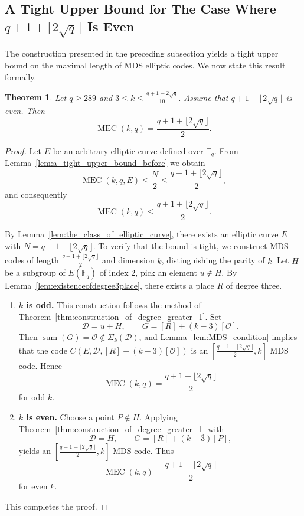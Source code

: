 \documentclass[journal,12pt,onecolumn]{IEEEtran}
\newtheorem{theorem}{Theorem}
\newcommand{\Point}{\operatorname{sum}}
\newcommand{\sumset}{\Sigma}
\begin{document}
\subsection{A Tight Upper Bound for The Case Where $q+1+ \lfloor 2\sqrt{q} \rfloor$ Is Even}


The construction presented in the preceding subsection yields a tight upper bound on the maximal length of MDS elliptic codes. We now state this result formally.

\begin{theorem}\label{thm:q+1+...even}
Let $q \ge 289$ and $3 \le k \le \frac{q+1-2\sqrt{q}}{10}$. Assume that $q+1+\lfloor 2\sqrt{q}\rfloor$ is even. Then
\[
\operatorname{MEC}(k,q) = \frac{q+1+\lfloor 2\sqrt{q}\rfloor}{2}.
\]
\end{theorem}

\begin{proof}
Let $E$ be an arbitrary elliptic curve defined over $\mathbb{F}_q$. From Lemma~\ref{lem:a_tight_upper_bound_before} we obtain
\[
\operatorname{MEC}(k,q,E) \le \frac{N}{2} \le \frac{q+1+\lfloor 2\sqrt{q}\rfloor}{2},
\]
and consequently
\[
\operatorname{MEC}(k,q) \le \frac{q+1+\lfloor 2\sqrt{q}\rfloor}{2}.
\]

By Lemma~\ref{lem:the_class_of_elliptic_curve}, there exists an elliptic curve $E$ with $N = q+1+\lfloor 2\sqrt{q}\rfloor$. To verify that the bound is tight, we construct MDS codes of length $\frac{q+1+\lfloor 2\sqrt{q}\rfloor}{2}$ and dimension $k$, distinguishing the parity of $k$.
Let $H$ be a subgroup of $E(\mathbb{F}_q)$ of index $2$, pick an element $u \notin H$. By Lemma~\ref{lem:existenceofdegree3place}, there exists a place $R$ of degree three. 

\begin{enumerate}
    \item \textbf{$k$ is odd.} This construction follows the method of Theorem~\ref{thm:construction_of_degree_greater_1}. 
    Set
    \[
    \mathcal{D} = u + H, \qquad G = [R] + (k-3)[\mathcal{O}].
    \]
    Then $\Point(G)=\mathcal{O} \notin \sumset_k(\mathcal{D})$, and Lemma~\ref{lem:MDS_condition} implies that the code $C(E,\mathcal{D},[R] + (k-3)[\mathcal{O}])$ is an $[\frac{q+1+\lfloor 2\sqrt{q}\rfloor}{2}, k]$ MDS code. Hence
    \[
    \operatorname{MEC}(k,q) = \frac{q+1+\lfloor 2\sqrt{q}\rfloor}{2}
    \]
    for odd $k$.

    \item \textbf{$k$ is even.} Choose a point $P \notin H$. Applying Theorem~\ref{thm:construction_of_degree_greater_1} with
    \[
    \mathcal{D} = H, \qquad G = [R] + (k-3)[P],
    \]
    yields an $[\frac{q+1+\lfloor 2\sqrt{q}\rfloor}{2}, k]$ MDS code. Thus
    \[
    \operatorname{MEC}(k,q) = \frac{q+1+\lfloor 2\sqrt{q}\rfloor}{2}
    \]
    for even $k$.
\end{enumerate}

This completes the proof.
\end{proof}
\end{document}
